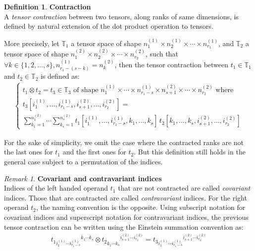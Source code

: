 \documentclass{article}
\theoremstyle{definition}
\newtheorem{definition}{Definition}[section]
\theoremstyle{remark}
\newtheorem{remark}{Remark}
\theoremstyle{plain}
\newcommand{\tspace}{\mathbb{T}}
\begin{document}
\begin{definition}\textbf{Contraction}\\
A \emph{tensor contraction} between two tensors, along ranks of same dimensions, is defined by natural extension of the dot product operation to tensors.

More precisely, let $\tspace_1$ a tensor space of shape $n_1^{(1)} \times n_2^{(1)} \times \cdots \times n_{r_1}^{(1)}$, and $\tspace_2$ a tensor space of shape $n_1^{(2)} \times n_2^{(2)} \times \cdots \times n_{r_2}^{(2)}$, such that $\forall k \in \{1, 2, \ldots, s\}, n_{r_1-(s-k)}^{(1)} = n_k^{(2)}$, then the tensor contraction between $t_1 \in \tspace_1$ and $t_2 \in \tspace_2$ is defined as:
\begin{gather*}
\left\{
  \begin{array}{l}
    t_1 \otimes t_2 = t_3 \in \tspace_3 \text{ of shape } n_1^{(1)} \times \cdots \times n_{r_1-s}^{(1)} \times n_{s+1}^{(2)} \times \cdots \times n_{r_2}^{(2)}
    \text{ where} \\
    t_3[i_1^{(1)}, \ldots, i_{r_1-s}^{(1)}, i_{s+1}^{(2)}, \ldots, i_{r_2}^{(2)}] = \\
    \displaystyle \sum_{k_1=1}^{n_1^{(2)}} \cdots \sum_{k_s=1}^{n_s^{(2)}}
    t_1[i_1^{(1)}, \ldots, i_{r_1-s}^{(1)}, k_1, \ldots, k_s] \hspace{2pt}
    t_2[k_1, \ldots, k_s, i_{s+1}^{(2)}, \ldots, i_{r_2}^{(2)}]
  \end{array}
\right.
\end{gather*}
\end{definition}

For the sake of simplicity, we omit the case where the contracted ranks are not the last ones for $t_1$ and the first ones for $t_2$. But this definition still holds in the general case subject to a permutation of the indices.

\begin{remark}\textbf{Covariant and contravariant indices}\\
Indices of the left handed operand $t_1$ that are not contracted are called \emph{covariant} indices. Those that are contracted are called \emph{contravariant} indices. For the right operand $t_2$, the naming convention is the opposite. Using subscript notation for covariant indices and superscript notation for contravariant indices, the previous tensor contraction can be written using the Einstein summation convention as:
\begin{gather}
t_1 \hspace{0pt}_{i_1^{(1)} \cdots i_{r_1-s}^{(1)} } \hspace{0pt}^{ k_1 \cdots k_s} \otimes
t_2 \hspace{0pt}_{ k_1^{\phantom{(}} \cdots k_s^{\phantom{(}}} \hspace{0pt}^{i_{s+1}^{(2)} \cdots i_{r_2}^{(2)}} =
t_3 \hspace{0pt}_ {i_1^{(1)} \cdots i_{r_1-s}^{(1)} } \hspace{0pt}^{i_{s+1}^{(2)} \cdots i_{r_2}^{(2)}}
\label{indices}
\end{gather}
\end{remark}
\end{document}
